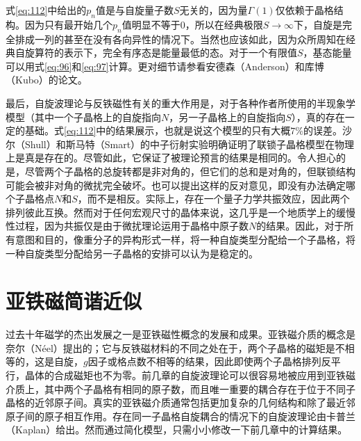 \documentclass{article}
\begin{document}
式\eqref{eq:112}中给出的$p_n$值是与自旋量子数$S$无关的，因为量$\Gamma(1)$仅依赖于晶格结构。因为只有最开始几个$p_n$值明显不等于$0$，所以在经典极限$S\rightarrow\infty$下，自旋是完全排成一列的甚至在没有各向异性的情况下。当然也应该如此，因为众所周知在经典自旋算符的表示下，完全有序态是能量最低的态。对于一个有限值$S$，基态能量可以用式\eqref{eq:96}和\eqref{eq:97}计算。更对细节请参看安德森（Anderson）和库博（Kubo）的论文。

最后，自旋波理论与反铁磁性有关的重大作用是，对于各种作者所使用的半现象学模型（其中一个子晶格上的自旋指向$N$，另一子晶格上的自旋指向$S$），真的存在一定的基础。式\eqref{eq:112}中的结果展示，也就是说这个模型的只有大概$7\%$的误差。沙尔（Shull）和斯马特（Smart）的中子衍射实验明确证明了联锁子晶格模型在物理上是真是存在的。尽管如此，它保证了被理论预言的结果是相同的。令人担心的是，尽管两个子晶格的总旋转都是非对角的，但它们的总和是对角的，但联锁结构可能会被非对角的微扰完全破坏。也可以提出这样的反对意见，即没有办法确定哪个子晶格点$N$和$S$，而不是相反。实际上，存在一个量子力学共振效应，因此两个排列彼此互换。然而对于任何宏观尺寸的晶体来说，这几乎是一个地质学上的缓慢性过程，因为共振仅是由于微扰理论运用于晶格中原子数$N$的结果。因此，对于所有意图和目的，像重分子的异构形式一样，将一种自旋类型分配给一个子晶格，将一种自旋类型分配给另一子晶格的安排可以认为是稳定的。




\section{亚铁磁简谐近似} \label{sec:9}

过去十年磁学的杰出发展之一是亚铁磁性概念的发展和成果。亚铁磁介质的概念是奈尔（N\'eel）提出的；它与反铁磁材料的不同之处在于，两个子晶格的磁矩是不相等的，这是自旋，$g$因子或格点数不相等的结果，因此即使两个子晶格排列反平行，晶体的合成磁矩也不为零。前几章的自旋波理论可以很容易地被应用到亚铁磁介质上，其中两个子晶格有相同的原子数，而且唯一重要的耦合存在于位于不同子晶格的近邻原子间。真实的亚铁磁介质通常包括更加复杂的几何结构和除了最近邻原子间的原子相互作用。存在同一子晶格自旋耦合的情况下的自旋波理论由卡普兰（Kaplan）给出。然而通过简化模型，只需小小修改一下前几章中的计算结果。
\end{document}
